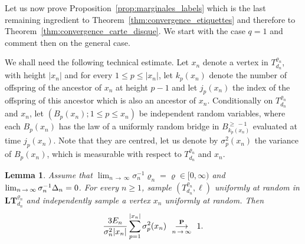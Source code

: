 \documentclass[10pt]{amsart}
\newtheorem{lemm}[theo]{Lemma}\newtheorem{prop}[theo]{Proposition}\newtheorem{coro}[theo]{Corollary}\newtheorem{conj}[theo]{Conjecture}
\theoremstyle{definition}\newtheorem{defi}[theo]{Definition}\newtheorem{rema}[theo]{Remark}\newtheorem{exam}[theo]{Example}\newtheorem{exem}[theo]{Example}\newtheorem{nota}[theo]{Notation}
\newcommand{\ensembles}[1]{\mathbf{#1}}
\renewcommand{\P}{\ensembles{P}}
\newcommand{\1}{\ensembles{1}}
\newcommand{\LTree}{\mathbf{LT}}
\renewcommand{\le}{\leqslant}
\renewcommand{\ge}{\geqslant}
\newcommand{\BBmap}{B}
\newcommand{\fn}{T_{d_n}^{\varrho_n}}
\newcommand{\LFn}{\LTree_{d_n}^{\varrho_n}}
\newcommand{\edges}{E}
\newcommand{\cvproba}[1][n]{\enskip\mathop{\longrightarrow}^{\P}_{#1\,\to\, \infty}\enskip}
\providecommand{\?}{}
\begin{document}
Let us now prove Proposition~\ref{prop:marginales_labels} which is the last remaining ingredient to Theorem~\ref{thm:convergence_etiquettes} and therefore to Theorem~\ref{thm:convergence_carte_disque}. We start with the case $q=1$ and comment then on the general case.

We shall need the following technical estimate. Let $x_n$ denote a vertex in $\fn$, with height $|x_n|$ and for every $1 \le p \le |x_n|$, let $k_p(x_n)$ denote the number of offspring of the ancestor of $x_n$ at height $p-1$ and let $j_p(x_n)$ the index of the offspring of this ancestor which is also an ancestor of $x_n$. Conditionally on $\fn$ and $x_n$, let $(B_p(x_n) ; 1 \le p \le x_n)$ be independent random variables, where each $B_p(x_n)$ has the law of a uniformly random bridge in $\BBmap_{k_p(x_n)}^{\ge\,-1}$ evaluated at time $j_p(x_n)$. Note that they are centred, let us denote by $\sigma^2_p(x_n)$ the variance of $B_p(x_n)$, which is measurable with respect to $\fn$ and $x_n$.

\begin{lemm}\label{lem:convergence_variance_labels}
Assume that $\lim_{n\,\to\,\infty} \sigma_n^{-1} \varrho_n = \varrho \in [0, \infty)$ and $\lim_{n\,\to\, \infty} \sigma_n^{-1} \Delta_n\linebreak= 0$. For every $n \ge 1$, sample $(\fn, \ell)$ uniformly at random in $\LFn$ and independently sample a vertex $x_n$ uniformly at random. Then
\[
\frac{3 \edges_n}{\sigma_n^2 |x_n|} \sum_{p=1}^{|x_n|} \sigma^2_p(x_n) \cvproba 1.
\]
\end{lemm}
\end{document}
